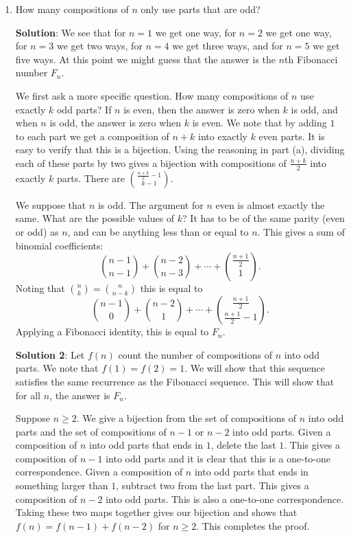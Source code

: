 \documentclass[11pt]{article}
\begin{document}
\begin{enumerate}
\begin{enumerate}
\item How many compositions of $n$ only use parts that are odd?

{\bf Solution}:  We see that for $n=1$ we get one way, for $n=2$ we get one way, for $n=3$ we get two ways, for $n=4$ we get three ways, and for $n=5$ we get five ways.  At this point we might guess that the answer is the $n$th Fibonacci number $F_n$.

We first ask a more specific question.  How many compositions of $n$ use exactly $k$ odd parts?  If $n$ is even, then the answer is zero when $k$ is odd, and when $n$ is odd, the answer is zero when $k$ is even.  We note that by adding $1$ to each part we get a composition of $n+k$ into exactly $k$ even parts.  It is easy to verify that this is a bijection.  Using the reasoning in part (a), dividing each of these parts by two gives a bijection with compositions of $\frac{n+k}{2}$ into exactly $k$ parts.  There are $\binom{\frac{n+k}{2} -1}{k-1}$. 

We suppose that $n$ is odd.  The argument for $n$ even is almost exactly the same.  What are the possible values of $k$?  It has to be of the same parity (even or odd) as $n$, and can be anything less than or equal to $n$.  This gives a sum of binomial coefficients:
\[
\binom{n-1}{n-1} + \binom{n-2}{n-3} + \cdots + \binom{\frac{n+1}{2}}{1}.
\]
Noting that $\binom{n}{k} = \binom{n}{n-k}$ this is equal to
\[
\binom{n-1}{0} + \binom{n-2}{1} + \cdots + \binom{\frac{n+1}{2}}{\frac{n+1}{2} - 1}.
\]
Applying a Fibonacci identity, this is equal to $F_n$.  

{\bf Solution 2}:  Let $f(n)$ count the number of compositions of $n$ into odd parts. We note that $f(1) = f(2) = 1$.  We will show that this sequence satisfies the same recurrence as the Fibonacci sequence.  This will show that for all $n$, the answer is $F_n$.

Suppose $n \ge 2$.  We give a bijection from the set of compositions of $n$ into odd parts and the set of compositions of $n-1$ or $n-2$ into odd parts.  Given a composition of $n$ into odd parts that ends in $1$, delete the last $1$.  This gives a composition of $n-1$ into odd parts and it is clear that this is a one-to-one correspondence.  Given a composition of $n$ into odd parts that ends in something larger than $1$, subtract two from the last part.  This gives a composition of $n-2$ into odd parts.  This is also a one-to-one correspondence.  Taking these two maps together gives our bijection and shows that $f(n) = f(n-1) + f(n-2)$ for $n \ge 2$.  This completes the proof.



\end{enumerate}
\end{enumerate}
\end{document}
